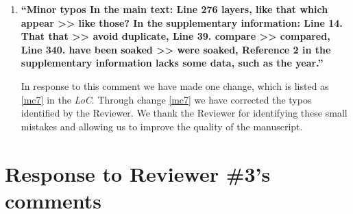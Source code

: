 \documentclass[11pt,letterpaper]{report}
\begin{document}
\begin{enumerate}[label=\textit{2.\arabic*},wide, labelwidth=!, labelindent=0pt]
\item \label{r2c10} {\bf ``Minor typos
In the main text: Line 276 layers, like that which appear >> like those? In the supplementary information: Line 14. That that >> avoid duplicate, Line 39. compare >> compared, Line 340. have been soaked >> were soaked, Reference 2 in the supplementary information lacks some data, such as the year.''}

In response to this comment we have made one change, which is listed as \ref{mc7} in the \textit{LoC}.
%
Through change \ref{mc7} we have corrected the typos identified by the Reviewer. We thank the Reviewer for identifying these small mistakes and allowing us to improve the quality of the manuscript.

\end{enumerate}

\clearpage
\section*{Response to Reviewer \#3's comments}
\label{rev3}
\end{document}
